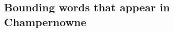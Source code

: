\documentclass[11pt,a4paper,twoside]{tesis}
\theoremstyle{definition}
\begin{document}












\subsection{Bounding words that appear in Champernowne}
\end{document}
